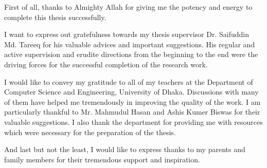 First of all, thanks to Almighty Allah for giving me the potency and energy to complete this thesis successfully.

I want to express out gratefulness towards my thesis supervisor Dr. Saifuddin Md. Tareeq for his valuable advices and important suggestions. His regular and active supervision and erudite directions from the beginning to the end were the driving forces for the successful completion of the research work. 

I would like to convey my gratitude to all of my teachers at the Department of Computer Science and Engineering, University of Dhaka. Discussions with many of them have helped me tremendously in improving the quality of the work. I am particularly thankful to Mr. Mahmudul Hasan and Ashis Kumer Biswas for their valuable suggestions. I also thank the department for providing me with resources which were necessary for the preparation of the thesis.


And last but not the least, I would like to express thanks to my parents and family members for their tremendous support and inspiration.


